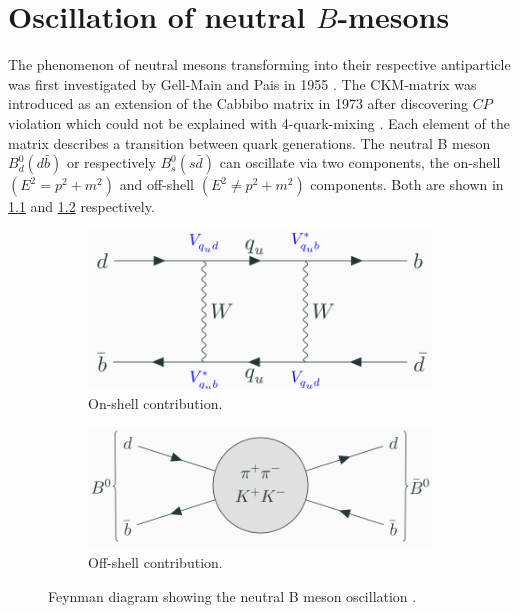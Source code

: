 \chapter{Oscillation of neutral $B$-mesons}

The phenomenon of neutral mesons transforming into their respective antiparticle was first investigated by Gell-Main and Pais in 1955 \cite{PhysRev.97.1387}.
The CKM-matrix was introduced as an extension of the Cabbibo matrix in 1973 after discovering $CP$ violation which could not be explained with 4-quark-mixing \cite{10.1143/PTP.49.652}.
Each element of the matrix describes a transition between quark generations.
The neutral B meson $B^0_d(d\bar b)$ or respectively $B^0_s(s\bar d)$ can oscillate via two components, the on-shell $(E^2= p^2+m^2)$ and off-shell $(E^2\neq p^2+m^2)$ components.
Both are shown in \ref{fig:feynmanOnshell} and \ref{fig:feynmanOffshell} respectively.
\begin{figure}
    \centering
    \begin{subfigure}[B]{.5\textwidth}   %
        \centering
        \includegraphics[width=.8\textwidth]{figs/feynmanOnshell.png}
        \caption{On-shell contribution.}
        \label{fig:feynmanOnshell}
    \end{subfigure}
    \begin{subfigure}[B]{.45\textwidth}   %
        \centering
        \includegraphics[width=.8\textwidth]{figs/feynmanOffshell.png}
        \caption{Off-shell contribution.}
        \label{fig:feynmanOffshell}
    \end{subfigure}
    \caption{Feynman diagram showing the neutral B meson oscillation \cite{Kpopp}.}
    \label{fig:feynmanDiagram}
\end{figure}
